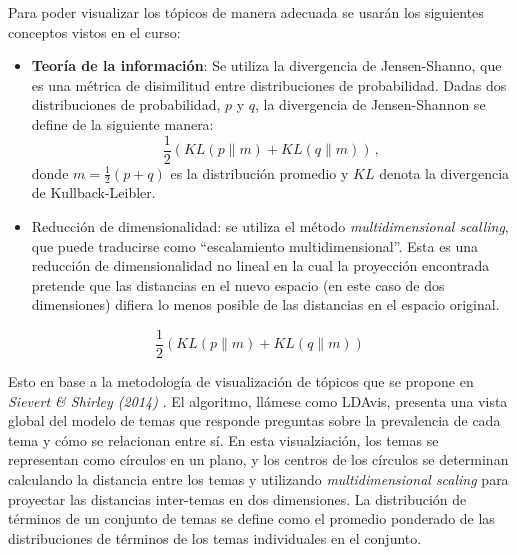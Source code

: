 \documentclass[
	spanish, %
	letterpaper, oneside
]{article}
\begin{document}

\newp Para poder visualizar los tópicos de manera adecuada se usarán los siguientes conceptos vistos en el curso:
\begin{itemize}
    \item \textbf{Teoría de la información}: Se utiliza la divergencia de Jensen-Shanno, que es una métrica de disimilitud entre distribuciones de probabilidad. Dadas dos distribuciones de probabilidad, $p$ y $q$, la divergencia de Jensen-Shannon se define de la siguiente manera:
    $$ \frac{1}{2}(KL(p\|m) + KL(q \| m) ) \,,$$
    donde $m = \frac{1}{2}(p + q)$ es la distribución promedio y $KL$ denota la divergencia de Kullback-Leibler.
    \item Reducción de dimensionalidad: se utiliza el método \textit{multidimensional scalling}, que puede traducirse como ``escalamiento multidimensional''. Esta es una reducción de dimensionalidad no lineal en la cual la proyección encontrada pretende que las distancias en el nuevo espacio (en este caso de dos dimensiones) difiera lo menos posible de las distancias en el espacio original.
\end{itemize}

$$ \frac{1}{2}(KL(p\|m) + KL(q \| m) ) $$

Esto en base a la metodología de visualización de tópicos que se propone en \textit{Sievert \& Shirley (2014)} \cite{viz}. El algoritmo, llámese como LDAvis, presenta una vista global del modelo de temas que responde preguntas sobre la prevalencia de cada tema y cómo se relacionan entre sí. En esta visualziación, los temas se representan como círculos en un plano, y los centros de los círculos se determinan calculando la distancia entre los temas y utilizando \textit{multidimensional scaling} para proyectar las distancias inter-temas en dos dimensiones. La distribución de términos de un conjunto de temas se define como el promedio ponderado de las distribuciones de términos de los temas individuales en el conjunto.
\end{document}

